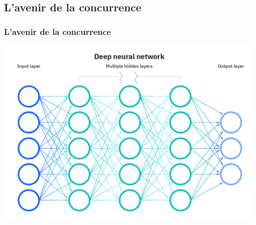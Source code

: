\documentclass{beamer}
\begin{document}
\subsection{L'avenir de la concurrence}
\begin{frame}
  \frametitle{L'avenir de la concurrence}
  \begin{center}
    \includegraphics[width=.9\textwidth]{reseaux-neurones.png}
  \end{center}
\end{frame}
\end{document}
